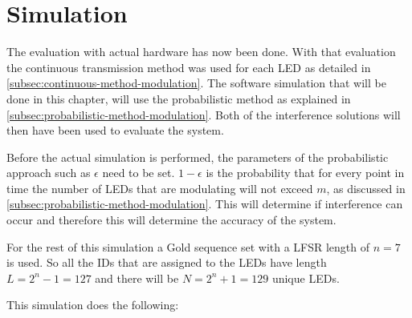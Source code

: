 
\section{Simulation}
\label{sec:simulation-evaluation}

The evaluation with actual hardware has now been done.
With that evaluation the continuous transmission method was used for each LED as detailed in \autoref{subsec:continuous-method-modulation}.
The software simulation that will be done in this chapter, will use the probabilistic method as explained in \autoref{subsec:probabilistic-method-modulation}.
Both of the interference solutions will then have been used to evaluate the system.




Before the actual simulation is performed, the parameters of the probabilistic approach such as $\epsilon$ need to be set.
$1 - \epsilon$ is the probability that for every point in time the number of LEDs that are modulating will not exceed $m$, as discussed in \autoref{subsec:probabilistic-method-modulation}.
This will determine if interference can occur and therefore this will determine the accuracy of the system.

For the rest of this simulation a Gold sequence set with a LFSR length of $n = 7$ is used.
So all the IDs that are assigned to the LEDs have length $L = 2^n - 1 = 127$ and there will be $N = 2^n + 1 = 129$ unique LEDs.

This simulation does the following: 

